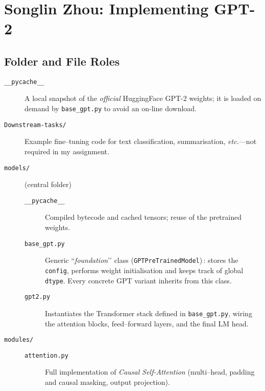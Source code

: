 \documentclass{article}
\theoremstyle{definition}
\begin{document}
  \section{Songlin Zhou: Implementing GPT-2}
  \subsection{Folder and File Roles}

  \begin{description}
    \item[\texttt{\_\_pycache\_\_}]%
          A local snapshot of the \emph{official} HuggingFace
          GPT{\tiny -}2 weights; it is loaded on demand by
          \texttt{base\_gpt.py} to avoid an on-line download.
  
    \item[\texttt{Downstream-tasks/}]%
          Example fine–tuning code for text classification, summarisation,
          \emph{etc.}\;—\;not required in my assignment.
  
    \item[\texttt{models/}]  \hfill (central folder)
            \begin{description}
              \item[\texttt{\_\_pycache\_\_}]%
                     Compiled bytecode and cached tensors; reuse of the
                     pretrained weights.
  
              \item[\texttt{base\_gpt.py}]%
                     Generic “\emph{foundation}’’ class
                     (\texttt{GPTPreTrainedModel})\,: stores the
                     \texttt{config}, performs weight initialisation
                     and keeps track of global \texttt{dtype}. Every
                     concrete GPT variant inherits from this class.
  
              \item[\texttt{gpt2.py}]%
                     Instantiates the Transformer stack defined in
                     \texttt{base\_gpt.py}, wiring the attention blocks,
                     feed–forward layers, and the final LM head.
            \end{description}

    \item[\texttt{modules/}]
    

            \begin{description}
              \item[\texttt{attention.py}]%
                     Full implementation of \emph{Causal Self-Attention}
                     (multi–head, padding and causal masking, output
                     projection).
    

\end{description}
\end{description}
\end{document}

